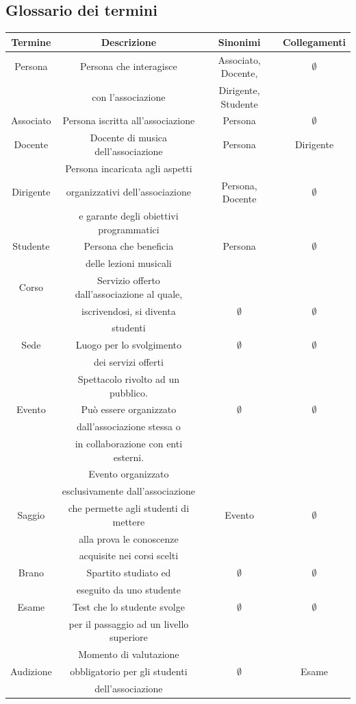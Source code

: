 \documentclass[11pt]{article}
\begin{document}
	\subsection{Glossario dei termini}
		\begin{tabular}{|c|c|c|c|}
			\hline
			Termine & Descrizione & Sinonimi & Collegamenti\\
			\hline
			Persona & Persona che interagisce & Associato, Docente,&$\emptyset$\\
			& con l'associazione & Dirigente, Studente &\\
			\hline
			Associato & Persona iscritta all'associazione & Persona &$\emptyset$ \\
			\hline
			Docente & Docente di musica dell'associazione  & Persona & Dirigente\\
			\hline
			& Persona incaricata agli aspetti & & \\
			Dirigente & organizzativi dell'associazione & Persona, Docente &$\emptyset$ \\
			 & e garante degli obiettivi programmatici && \\
			\hline
			Studente & Persona che beneficia & Persona & $\emptyset$\\
			& delle lezioni musicali & & \\
			\hline
			Corso & Servizio offerto dall'associazione al quale, & &\\
			& iscrivendosi, si diventa&$\emptyset$ &$\emptyset$\\
			& studenti & &\\
			\hline
			Sede & Luogo per lo svolgimento &$\emptyset$ &$\emptyset$\\
			& dei servizi offerti & &\\
			\hline
			& Spettacolo rivolto ad un pubblico.& &\\
			Evento & Può essere organizzato &$\emptyset$ &$\emptyset$\\
			& dall'associazione stessa o & &\\
			& in collaborazione con enti esterni. & &\\
			\hline
			& Evento organizzato& &\\
			& esclusivamente dall'associazione& &\\
			Saggio& che permette agli studenti di mettere& Evento &$\emptyset$\\
			&  alla prova le conoscenze & &\\
			&  acquisite nei corsi scelti & &\\
			\hline
			Brano & Spartito studiato ed &$\emptyset$ &$\emptyset$\\
			& eseguito da uno studente & &\\
			\hline
			Esame & Test che lo studente svolge &$\emptyset$ &$\emptyset$\\
			& per il passaggio ad un livello superiore & &\\
			\hline
			& Momento di valutazione& &\\
			Audizione & obbligatorio per gli studenti&$\emptyset$ & Esame\\
			& dell'associazione & &\\
			\hline
			\end{tabular}
\end{document}
